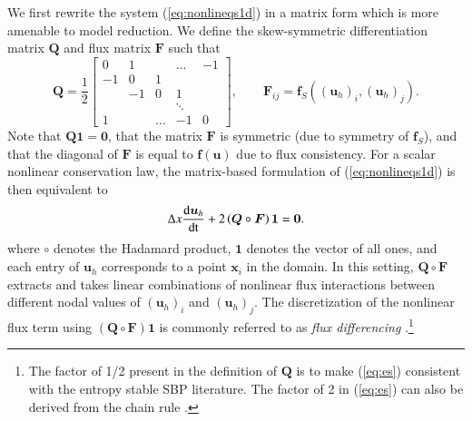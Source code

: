 \documentclass[preprint,10pt]{elsarticle}
\theoremstyle{definition}
\theoremstyle{lemma}
\theoremstyle{theorem}
\theoremstyle{assumption}
\newcommand{\td}[2]{\frac{{\rm d}#1}{{\rm d}{\rm #2}}}
\newcommand{\LRp}[1]{\left( #1 \right)}
\begin{document}
We first rewrite the system (\ref{eq:nonlineqs1d}) in a matrix form which is more amenable to model reduction.  We define the skew-symmetric differentiation matrix $\bm{Q}$ and flux matrix $\bm{F}$ such that
\begin{equation}
\bm{Q} = \frac{1}{2}\begin{bmatrix}
0 & 1 & &\ldots & -1\\
-1 & 0 & 1 &&  \\
& -1 & 0 & 1 &  \\
 & & & \ddots &  \\
1 & &\ldots  & -1 & 0
\end{bmatrix}, \qquad \bm{F}_{ij} = \bm{f}_{S}\LRp{\LRp{\bm{u}_h}_i, \LRp{\bm{u}_h}_j}.
\label{eq:Qmat}
\end{equation}
Note that $\bm{Q}\bm{1} = \bm{0}$, that the matrix $\bm{F}$ is symmetric (due to symmetry of $\bm{f}_S$), and that the diagonal of $\bm{F}$ is equal to $\bm{f}(\bm{u})$ due to flux consistency.  For a scalar nonlinear conservation law, the matrix-based formulation of (\ref{eq:nonlineqs1d}) is then equivalent to
\begin{align}
\Delta x \td{\bm{u}_h}{t} + 2\LRp{{\bm{Q}}\circ \bm{F}}\bm{1} = \bm{0}.
\label{eq:es}
\end{align}
where $\circ$ denotes the Hadamard product, $\bm{1}$ denotes the vector of all ones, and each entry of $\bm{u}_h$ corresponds to a point $\bm{x}_i$ in the domain.  In this setting, $\bm{Q}\circ\bm{F}$ extracts and takes linear combinations of nonlinear flux interactions between different nodal values of $(\bm{u}_h)_i$ and $(\bm{u}_h)_j$.  The discretization of the nonlinear flux term using $\LRp{\bm{Q}\circ \bm{F}}\bm{1}$ is commonly referred to as \textit{flux differencing} \cite{carpenter2014entropy, gassner2016split, chen2017entropy, crean2018entropy, chan2017discretely}.\footnote{The factor of 1/2 present in the definition of $\bm{Q}$ is to make (\ref{eq:es}) consistent with the entropy stable SBP literature.  The factor of 2 in (\ref{eq:es}) can also be derived from the chain rule \cite{chen2017entropy, crean2018entropy}.  }
\end{document}
